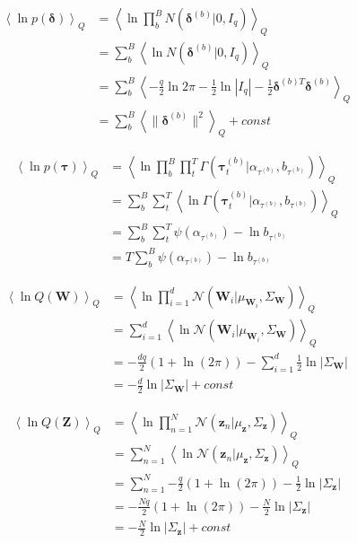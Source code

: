 \documentclass[10pt]{article}
\newcommand{\Angle}[1]{\left \langle #1 \right \rangle}
\newcommand{\Eq}[1]{\Angle{#1}_Q}
\newcommand{\N}[2][]{\mathcal{N} \left( #1,#2 \right)}
\newcommand{\Det}[1]{\left| #1 \right|}
\begin{document}
    \begin{align}
        \Eq{\ln{p(\bm{\delta})}}&=\Eq{\ln{\prod_b^B N(\bm{\delta}^{(b)}|0,I_q)}} \nonumber \\
        &=\sum_b^B\Eq{\ln{N(\bm{\delta}^{(b)}|0,I_q)}} \nonumber \\
        &=\sum_b^B\Eq{-\frac{q}{2}\ln{2\pi} -\frac{1}{2}\ln{|I_q|} - \frac{1}{2}\bm{\delta}^{(b)T}\bm{\delta}^{(b)}} \nonumber \\
        &=\sum_b^B\Eq{\|\bm{\delta}^{(b)}\|^2} + const
        \label{pdelta}
    \end{align}

    \begin{align}
        \Eq{\ln{p(\bm{\tau})}}&=\Eq{\ln{\prod_b^B\prod_t^T\Gamma(\bm{\tau}_t^{(b)}| \alpha_{\tau^{(b)}}, b_{\tau^{(b)}})}} \nonumber \\
        &=\sum_b^B\sum_t^T\Eq{\ln{\Gamma(\bm{\tau}_t^{(b)}| \alpha_{\tau^{(b)}}, b_{\tau^{(b)}})}} \nonumber \\
        &=\sum_b^B\sum_t^T \psi(\alpha_{\tau^{(b)}}) - \ln{b_{\tau^{(b)}}} \nonumber \\
        &=T\sum_b^B\psi(\alpha_{\tau^{(b)}}) - \ln{b_{\tau^{(b)}}}
        \label{ptau}
    \end{align}

    \begin{align}
        \Eq{\ln{Q(\bm{W})}}&=\Eq{\ln{\prod_{i=1}^d{\N[\bm{W}_i | \mu_{\bm{W}_i}]{\Sigma_{\bm{W}}}}}} \nonumber\\
        &=\sum_{i=1}^d{\Eq{\ln{\N[{\bm{W}_i} | \mu_{\bm{W}_i}]{\Sigma_{\bm{W}}}}}} \nonumber \\
        &=-\frac{dq}{2}(1+\ln(2\pi)) - \sum_{i=1}^d{\frac{1}{2}\ln{\Det{\Sigma_{\bm{W}}}}}  \nonumber \\
        &=-\frac{d}{2}\ln{\Det{\Sigma_{\bm{W}}}} + const
        \label{qw}
    \end{align}

    \begin{align}
        \Eq{\ln{Q(\bm{Z})}}&=\Eq{\ln{\prod_{n=1}^N{\N[\bm{z}_n | \mu_{\bm{z}}]{\Sigma_{\bm{z}}}}}} \nonumber \\
        &=\sum_{n=1}^N{\Eq{\ln{\N[\bm{z}_n \vert \mu_{\bm{z}}]{\Sigma_{\bm{z}}}}}} \nonumber \\
        &=\sum_{n=1}^N{-\frac{q}{2}(1+\ln(2\pi)) - \frac{1}{2}\ln{\Det{\Sigma_{\bm{z}}}}} \nonumber \\
        &=-\frac{Nq}{2}( 1+\ln(2\pi)) - \frac{N}{2}\ln{\Det{\Sigma_{\bm{z}}}} \nonumber \\
        &=-\frac{N}{2}\ln{\Det{\Sigma_{\bm{z}}}} + const
        \label{qz}
    \end{align}
\end{document}
